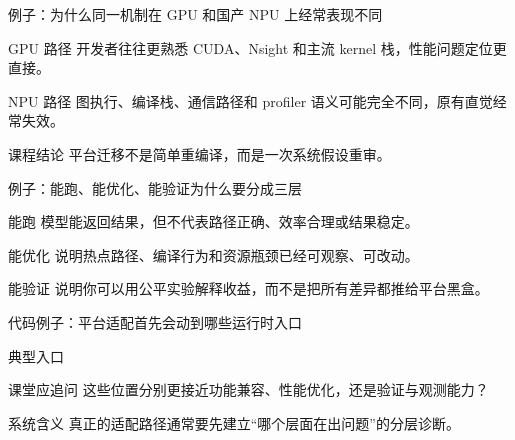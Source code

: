 \begin{frame}{例子：为什么同一机制在 GPU 和国产 NPU 上经常表现不同}
  \begin{block}{GPU 路径}
    开发者往往更熟悉 CUDA、Nsight 和主流 kernel 栈，性能问题定位更直接。
  \end{block}
  \pause
  \begin{block}{NPU 路径}
    图执行、编译栈、通信路径和 profiler 语义可能完全不同，原有直觉经常失效。
  \end{block}
  \pause
  \begin{block}{课程结论}
    平台迁移不是简单重编译，而是一次系统假设重审。
  \end{block}
\end{frame}

\begin{frame}{例子：能跑、能优化、能验证为什么要分成三层}
  \begin{block}{能跑}
    模型能返回结果，但不代表路径正确、效率合理或结果稳定。
  \end{block}
  \pause
  \begin{block}{能优化}
    说明热点路径、编译行为和资源瓶颈已经可观察、可改动。
  \end{block}
  \pause
  \begin{block}{能验证}
    说明你可以用公平实验解释收益，而不是把所有差异都推给平台黑盒。
  \end{block}
\end{frame}

\begin{frame}{代码例子：平台适配首先会动到哪些运行时入口}
  \begin{block}{典型入口}
    {\ttfamily\small
    \par
    \par
    \par
    }
  \end{block}
  \pause
  \begin{block}{课堂应追问}
    这些位置分别更接近功能兼容、性能优化，还是验证与观测能力？
  \end{block}
  \pause
  \begin{block}{系统含义}
    真正的适配路径通常要先建立“哪个层面在出问题”的分层诊断。
  \end{block}
\end{frame}

